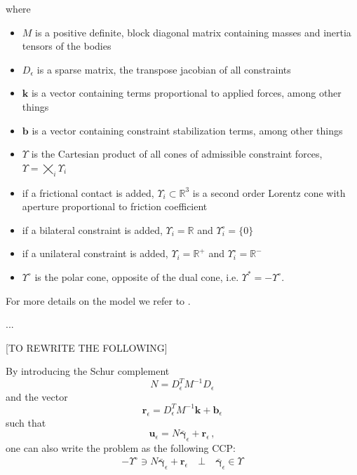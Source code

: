 \documentclass{svproc}
\newcommand{\vect}[1]{\bm{#1}}
\begin{document}
where 
\begin{itemize}
    \item $M$ is a positive definite, block diagonal matrix containing masses and inertia tensors of the bodies
    \item $D_\epsilon$ is a sparse matrix, the transpose jacobian of all constraints
    \item $\vect{k}$ is a vector containing terms proportional to applied forces, among other things 
    \item $\vect{b}$ is a vector containing constraint stabilization terms, among other things
    \item $\Upsilon$ is the Cartesian product of all cones of admissible constraint forces, $\Upsilon = \bigtimes_i \Upsilon_i$
    \item if a frictional contact is added, $\Upsilon_i \subset \mathbb{R}^3$ is a second order Lorentz cone with aperture proportional to friction coefficient
    \item if a bilateral constraint is added, $\Upsilon_i = \mathbb{R}$ and $\Upsilon^\circ_i = \{0\}$
    \item if a unilateral constraint is added, $\Upsilon_i = \mathbb{R}^+$ and $\Upsilon^\circ_i = \mathbb{R}^-$
    \item $\Upsilon^{\circ}$ is the polar cone, opposite of the dual cone, i.e. $\Upsilon^{*} = -\Upsilon^\circ$.
\end{itemize}


For more details on the model we refer to 
\cite{negrutSerbanTasoraJCND2017}. %

...


[TO REWRITE THE FOLLOWING]

By introducing the Schur complement 
\[
N=D_{\epsilon}^T M^{-1} D_{\epsilon}
\]
and the vector
\[
\vect{r}_\epsilon = D_{\epsilon}^T M^{-1} \vect{k} + \vect{b}_\epsilon
\]
such that
\[
\vect{u}_\epsilon = N \bar{\vect{\gamma}}_\epsilon + \vect{r}_\epsilon \, , 
\]
one can also write the problem as the following CCP:
\begin{align}
    -\Upsilon^{\circ} \ni  N \bar{\vect{\gamma}}_\epsilon + \vect{r}_\epsilon 
    \quad \bot \quad  
    \bar{\vect{\gamma}}_\epsilon \in \Upsilon
	\label{eq:ChronoCCP}
\end{align}
\end{document}
